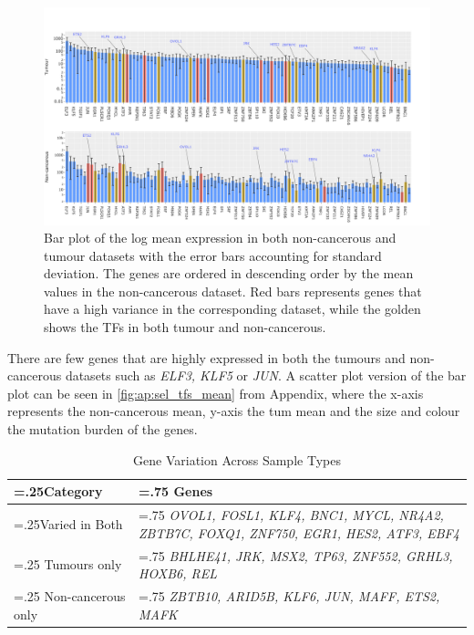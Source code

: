 \begin{figure}[!htb]   
\centering
\includegraphics[width=1.0\textwidth,height=1.0\textheight,keepaspectratio]{Sections/Network_I/Resources/selective_pruning/sel_tfs/sel_tfs_var_tum_healthy.png}
  \caption{Bar plot of the log mean expression in both non-cancerous and tumour datasets with the error bars accounting for standard deviation. The genes are ordered in descending order by the mean values in the non-cancerous dataset. Red bars represents genes that have a high variance in the corresponding dataset, while the golden shows the TFs in both tumour and non-cancerous.}
\label{fig:N_I:sel_tfs_var}
\end{figure}

There are few genes that are highly expressed in both the tumours and non-cancerous datasets such as \textit{ELF3, KLF5} or \textit{JUN}. A scatter plot version of the bar plot can be seen in \cref{fig:ap:sel_tfs_mean} from Appendix, where the x-axis represents the non-cancerous mean, y-axis the tum mean and the size and colour the mutation burden of the genes.

\begin{table}[H]
  \centering
  \scriptsize
  \begin{tabularx}{\textwidth}{>{\hsize=.25\hsize}X|>{\hsize=.75\hsize}X}
    \toprule
    \textbf{Category} & \textbf{Genes} \\
    \midrule
    Varied in Both & \textit{OVOL1, FOSL1, KLF4, BNC1, MYCL, NR4A2, ZBTB7C, FOXQ1, ZNF750, EGR1, HES2, ATF3, EBF4} \\
    \midrule
    Tumours only & \textit{BHLHE41, JRK, MSX2, TP63, ZNF552, GRHL3, HOXB6, REL} \\
    \midrule
    Non-cancerous only & \textit{ZBTB10, ARID5B, KLF6, JUN, MAFF, ETS2, MAFK} \\
    \bottomrule
  \end{tabularx}
    \caption{Gene Variation Across Sample Types} %
    \label{tab:N_I:sel_tfs_var}
\end{table}

